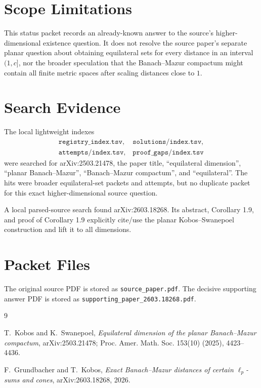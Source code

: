\documentclass[11pt]{article}
\begin{document}
\section*{Scope Limitations}

This status packet records an already-known answer to the source's
higher-dimensional existence question.  It does not resolve the source paper's
separate planar question about obtaining equilateral sets for every distance
in an interval \((1,c]\), nor the broader speculation that the Banach--Mazur
compactum might contain all finite metric spaces after scaling distances close
to \(1\).

\section*{Search Evidence}

The local lightweight indexes
\[
\begin{gathered}
\texttt{registry\_index.tsv},\quad
\texttt{solutions/index.tsv},\\
\texttt{attempts/index.tsv},\quad
\texttt{proof\_gaps/index.tsv}
\end{gathered}
\]
were searched for arXiv:2503.21478, the paper title, ``equilateral
dimension'', ``planar Banach--Mazur'', ``Banach--Mazur compactum'', and
``equilateral''.  The hits were broader equilateral-set packets and attempts,
but no duplicate packet for this exact higher-dimensional source question.

A local parsed-source search found arXiv:2603.18268.  Its abstract,
Corollary 1.9, and proof of Corollary 1.9 explicitly cite/use the planar
Kobos--Swanepoel construction and lift it to all dimensions.

\section*{Packet Files}

The original source PDF is stored as \texttt{source\_paper.pdf}.  The decisive
supporting answer PDF is stored as
\texttt{supporting\_paper\_2603.18268.pdf}.

\begin{thebibliography}{9}

T.~Kobos and K.~Swanepoel,
\emph{Equilateral dimension of the planar Banach--Mazur compactum},
arXiv:2503.21478; Proc. Amer. Math. Soc. 153(10) (2025), 4423--4436.

F.~Grundbacher and T.~Kobos,
\emph{Exact Banach--Mazur distances of certain \(\ell_p\)-sums and cones},
arXiv:2603.18268, 2026.

\end{thebibliography}
\end{document}
